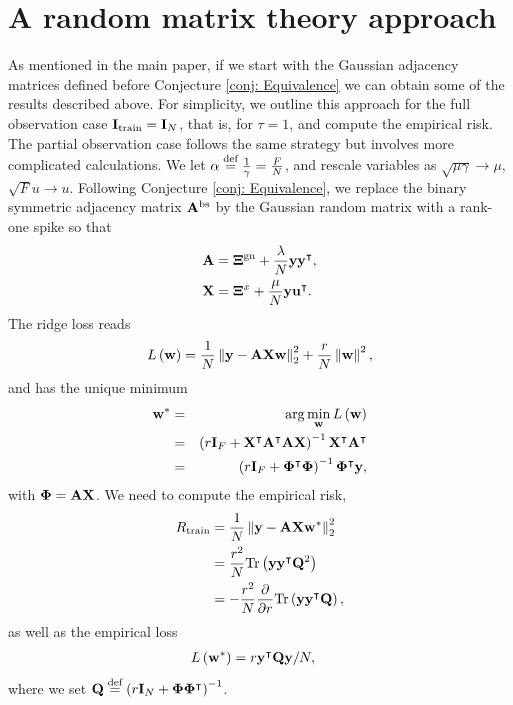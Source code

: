 \documentclass[9pt,twocolumn]{pnas-new}
\begin{document}
\section{A random matrix theory approach}\label{APP: RMT}

As mentioned in the main paper, if we start with the Gaussian adjacency matrices defined before Conjecture \ref{conj: Equivalence} we can obtain some of the results described above. For simplicity, we outline this approach for the full observation case $\mathbf{I}_{\text{train}} = \mathbf{I}_N$, that is, for $\tau=1$, and compute the empirical risk. The partial observation case follows the same strategy but involves more complicated calculations. We let $\alpha \overset{\text{def}}{=} \frac{1}{\gamma} = \frac{F}{N}$,
and rescale variables as $\sqrt{\mu\gamma}\to\mu$, $\sqrt{F}u\to u$. Following Conjecture \ref{conj: Equivalence}, we replace the binary symmetric adjacency matrix $\mathbf{A}^{\text{bs}}$ by the Gaussian random matrix with a rank-one spike so that
\begin{align*}
\mathbf{A} & =\boldsymbol{\Xi}^{\text{gn}}+\frac{\lambda}{N}\mathbf{y}\mathbf{y}^{\intercal},\\
\mathbf{X} & =\boldsymbol{\Xi}^{x}+\frac{\mu}{N}\mathbf{y} \mathbf{u}^{\intercal}.
\end{align*}
The ridge loss reads
\begin{equation*}
    L\left(\mathbf{w}\right)=\frac{1}{N}\left\Vert \mathbf{y}-\mathbf{A}\mathbf{X}\mathbf{w}\right\Vert _{2}^{2}+ \frac{r}{N}\left\Vert \mathbf{w}\right\Vert^{2},
\end{equation*}
and has the unique minimum
\begin{eqnarray*}
\mathbf{w}^{*} & = & \arg\min_{\mathbf{w}}L\left(\mathbf{w}\right)\\
 & = & \left(r\mathbf{I}_F+\mathbf{X}^{\intercal}\mathbf{A}^{\intercal}\mathbf{A}\mathbf{X}\right)^{-1}\mathbf{X}^{\intercal}\mathbf{A}^{\intercal}\\
 & = & \left(r\mathbf{I}_F+\boldsymbol{\Phi}^{\intercal}\boldsymbol{\Phi}\right)^{-1}\boldsymbol{\Phi}^{\intercal}\mathbf{y},
\end{eqnarray*}
with ${\boldsymbol{\Phi}=\mathbf{A}\mathbf{X}}$. We need to compute the empirical risk,
\begin{align*}
R_{\text{train}}&= \frac{1}{N}\left\Vert \mathbf{y}-\mathbf{A}\mathbf{X}\mathbf{w}^{*}\right\Vert _{2}^{2}\\
&=  \frac{r^{2}}{N}\mathrm{Tr}\left(\mathbf{y}\mathbf{y}^{\intercal}\mathbf{Q}^{2}\right)\\
&=  -\frac{r^{2}}{N}\frac{\partial}{\partial r}\mathrm{Tr}\left(\mathbf{y}\mathbf{y}^{\intercal}\mathbf{Q}\right),
\end{align*}
as well as the empirical loss
\begin{align}
L\left(\mathbf{w}^{*}\right) & =r\mathbf{y}^{\intercal}\mathbf{Q}\mathbf{y}/N,\label{eqn: RMT_L}
\end{align}
where we set $\mathbf{Q} \overset{\text{def}}{=} \left(r\mathbf{I}_N+\boldsymbol{\Phi}\boldsymbol{\Phi}^{\intercal}\right)^{-1}$.
\end{document}
